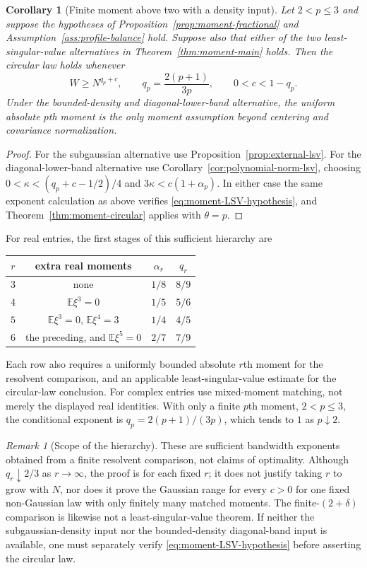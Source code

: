 \documentclass[11pt,reqno]{amsart}
\numberwithin{equation}{section}
\theoremstyle{plain}
\newtheorem{corollary}[theorem]{Corollary}
\theoremstyle{definition}
\theoremstyle{remark}
\newtheorem{remark}[theorem]{Remark}
\begin{document}
\begin{corollary}[Finite moment above two with a density input]
\label{cor:moment-finite-p}
Let $2<p\le3$ and suppose the hypotheses of
Proposition~\ref{prop:moment-fractional} and
Assumption~\ref{ass:profile-balance} hold.  Suppose also that either of
the two least-singular-value alternatives in
Theorem~\ref{thm:moment-main} holds.  Then the circular law holds whenever
\[
 W\ge N^{q_p+c},\qquad q_p=\frac{2(p+1)}{3p},\qquad
 0<c<1-q_p.
\]
Under the bounded-density and diagonal-lower-band alternative, the
uniform absolute $p$th moment is the only moment assumption beyond
centering and covariance normalization.
\end{corollary}

\begin{proof}
For the subgaussian alternative use
Proposition~\ref{prop:external-lsv}.  For the diagonal-lower-band
alternative use Corollary~\ref{cor:polynomial-norm-lsv}, choosing
$0<\kappa<(q_p+c-1/2)/4$ and
$3\kappa<c(1+\alpha_p)$.  In either case the same exponent calculation
as above verifies \eqref{eq:moment-LSV-hypothesis}, and
Theorem~\ref{thm:moment-circular} applies with $\theta=p$.
\end{proof}

For real entries, the first stages of this sufficient hierarchy are
\begin{center}
\begin{tabular}{c|c|c|c}
$r$ & extra real moments & $\alpha_r$ & $q_r$\\ \hline
$3$ & none & $1/8$ & $8/9$\\
$4$ & $\mathbb E\xi^3=0$ & $1/5$ & $5/6$\\
$5$ & $\mathbb E\xi^3=0$, $\mathbb E\xi^4=3$ & $1/4$ & $4/5$\\
$6$ & the preceding, and $\mathbb E\xi^5=0$ & $2/7$ & $7/9$
\end{tabular}
\end{center}
Each row also requires a uniformly bounded absolute $r$th moment for the
resolvent comparison, and an applicable least-singular-value estimate
for the circular-law conclusion.  For complex entries use mixed-moment
matching, not merely the displayed real identities.  With only a finite
$p$th moment, $2<p\le3$, the conditional exponent is
$q_p=2(p+1)/(3p)$, which tends to $1$ as $p\downarrow2$.

\begin{remark}[Scope of the hierarchy]
These are sufficient bandwidth exponents obtained from a finite
resolvent comparison, not claims of optimality.  Although
$q_r\downarrow2/3$ as $r\to\infty$, the proof is for each fixed $r$;
it does not justify taking $r$ to grow with $N$, nor does it prove the
Gaussian range for every $c>0$ for one fixed non-Gaussian law with only
finitely many matched moments.  The finite-$(2+\delta)$ comparison is likewise
not a least-singular-value theorem.  If neither the subgaussian-density
input nor the bounded-density diagonal-band input is available, one
must separately verify \eqref{eq:moment-LSV-hypothesis} before asserting
the circular law.
\end{remark}
\end{document}
